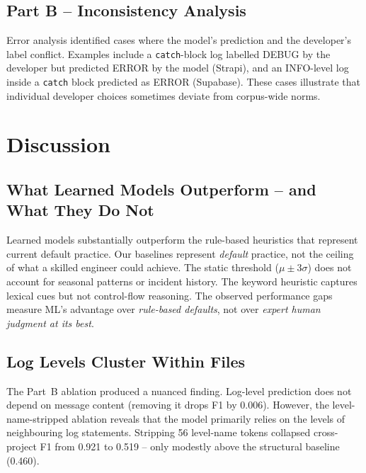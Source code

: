 \documentclass[10pt,twocolumn]{article}
\begin{document}
\subsection{Part B -- Inconsistency Analysis}

Error analysis identified cases where the model's prediction and the developer's label conflict. Examples include a \texttt{catch}-block log labelled DEBUG by the developer but predicted ERROR by the model (Strapi), and an INFO-level log inside a \texttt{catch} block predicted as ERROR (Supabase). These cases illustrate that individual developer choices sometimes deviate from corpus-wide norms.

\section{Discussion}
\label{sec:discussion}

\subsection{What Learned Models Outperform -- and What They Do Not}

Learned models substantially outperform the rule-based heuristics that represent current default practice. Our baselines represent \emph{default} practice, not the ceiling of what a skilled engineer could achieve. The static threshold ($\mu \pm 3\sigma$) does not account for seasonal patterns or incident history. The keyword heuristic captures lexical cues but not control-flow reasoning. The observed performance gaps measure ML's advantage over \emph{rule-based defaults}, not over \emph{expert human judgment at its best}.

\subsection{Log Levels Cluster Within Files}
\label{sec:clustering}

The Part~B ablation produced a nuanced finding. Log-level prediction does not depend on message content (removing it drops F1 by 0.006). However, the level-name-stripped ablation reveals that the model primarily relies on the levels of neighbouring log statements. Stripping 56 level-name tokens collapsed cross-project F1 from 0.921 to 0.519 -- only modestly above the structural baseline (0.460).
\end{document}
